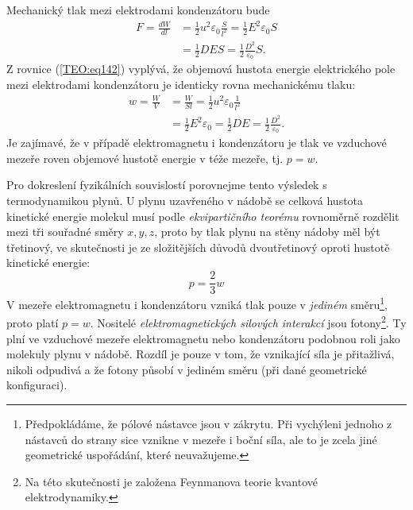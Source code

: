       Mechanický tlak mezi elektrodami kondenzátoru bude
      \begin{align*}
        F  = \frac{dW}{dl} 
          &= \frac{1}{2}u^2\varepsilon_0\frac{S}{l^2}
           = \frac{1}{2}E^2\varepsilon_0S                                  \\
          &= \frac{1}{2}DES          
           = \frac{1}{2}\frac{D^2}{\varepsilon_0}S.
      \end{align*}
      Z rovnice (\ref{TEO:eq142}) vyplývá, že objemová hustota energie elektrického pole 
      mezi elektrodami kondenzátoru je identicky rovna mechanickému tlaku:
      \begin{align*}
        w  = \frac{W}{V} 
          &= \frac{W}{Sl} 
           = \frac{1}{2}u^2\varepsilon_0\frac{1}{l^2}          \\
          &= \frac{1}{2}E^2\varepsilon_0 = \frac{1}{2}DE 
           = \frac{1}{2}\frac{D^2}{\varepsilon_0}.
      \end{align*}
      Je zajímavé, že v případě elektromagnetu i kondenzátoru je tlak ve vzduchové mezeře roven 
      objemové hustotě energie v téže mezeře, tj. \(p = w\).
      
      Pro dokreslení fyzikálních souvislostí porovnejme tento výsledek s termodynamikou plynů. U 
      plynu uzavřeného v nádobě se celková hustota kinetické energie molekul musí podle
      \emph{ekvipartičního teorému} rovnoměrně rozdělit mezi tři souřadné směry \(x, y, z\), proto 
      by tlak plynu na stěny nádoby měl být třetinový, ve skutečnosti je ze složitějších důvodů 
      dvoutřetinový oproti hustotě kinetické energie:
      \begin{equation*}
        p = \frac{2}{3}w
      \end{equation*}
      V mezeře elektromagnetu i kondenzátoru vzniká tlak pouze v \emph{jediném} 
      směru\footnote{Předpokládáme, že pólové nástavce jsou v zákrytu. Při vychýleni jednoho z 
      nástavců do strany sice vznikne v mezeře i boční síla, ale to je zcela jiné geometrické 
      uspořádání, které neuvažujeme.}, proto platí \(p = w\). Nositelé \emph{elektromagnetických 
      silových interakcí} jsou fotony\footnote{Na této skutečnosti je založena Feynmanova teorie 
      kvantové elektrodynamiky.}. Ty plní ve vzduchové mezeře elektromagnetu nebo 
      kondenzátoru podobnou roli jako molekuly plynu v nádobě. Rozdíl je pouze v tom, že vznikající 
      síla je přitažlivá, nikoli odpudivá a že fotony působí v jediném směru (při dané geometrické 
      konfiguraci).
      
